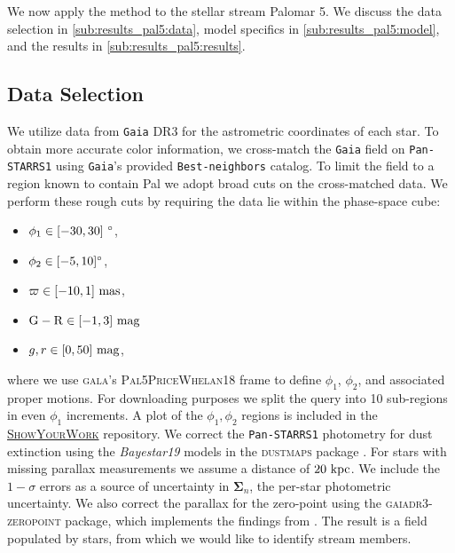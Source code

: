 \documentclass[twocolumn]{aastex631}
\newcommand{\code}[1]{\textsc{#1}}
\newcommand{\package}[1]{\code{#1}}
\newcommand{\stream}[1]{#1}
\newcommand{\dataarchive}[1]{\texttt{#1}}
\newcommand{\Gaia}{\dataarchive{Gaia}}
\newcommand{\PanStarrs}{\dataarchive{Pan-STARRS1}}
\newcommand{\mbs}[1]{\boldsymbol{#1}}
\newcommand{\parallax}{\varpi}
\begin{document}
    We now apply the method to the stellar stream \stream{Palomar 5}.
    We discuss the data selection in \autoref{sub:results_pal5:data}, model
    specifics in \autoref{sub:results_pal5:model}, and the results in
    \autoref{sub:results_pal5:results}.

    \subsection{Data Selection} \label{sub:results_pal5:data}


        

        We utilize data from \Gaia{} DR3 for the astrometric coordinates of each
        star.  To obtain more accurate color information, we cross-match the
        \Gaia{} field on \PanStarrs{} \citep{PanSTARRS1} using \Gaia's provided
        \texttt{Best-neighbors} catalog.  To limit the field to a region known
        to contain \stream{Pal} we adopt broad cuts on the cross-matched data.
        We perform these rough cuts by requiring the data lie within the
        phase-space cube:
        \begin{itemize}
            \item $\phi_1 \in [-30, 30] \ \rm{\degree}$,
            \item $\phi_2 \in [-5, 10] \rm{\degree}$,
            \item $\parallax \in [-10, 1] \ \rm{mas}$,
            \item $\rm{G-R} \in [-1, 3] \ \rm{mag}$
            \item $g, r \in [0, 50] \ \rm{mag}$,
        \end{itemize}
        where we use \package{gala}'s
        \code{Pal5PriceWhelan18} frame \citep{Price-Whelan+2019} to define $\phi_1$,
        $\phi_2$, and associated proper motions.  For downloading purposes we
        split the query into 10 sub-regions in even $\phi_1$ increments. A plot
        of the $\phi_1, \phi_2$ regions is included in the
        \href{\GitHubURL{}}{\package{ShowYourWork}} repository.
        We correct the \PanStarrs{} photometry for dust
        extinction using the \textit{Bayestar19} \citep{Green+2019} models in
        the \package{dustmaps} package \citep{Green2018}.
        For stars with missing parallax measurements we assume a distance of $20 \ \rm{kpc}$.  We include the $1-\sigma$ errors
        as a source of uncertainty in $\mbs{\Sigma}_n$, the per-star photometric
        uncertainty.
        We also correct the parallax for the zero-point using the \code{gaiadr3-zeropoint} package, which implements the findings from \cite{Lindegren+2021}.
        The result is a field populated by
         stars, from which we would like
        to identify stream members.
\end{document}
